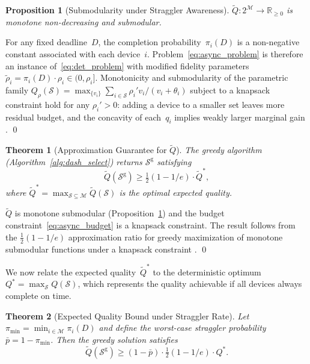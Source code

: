 \documentclass[a4paper,fleqn]{cas-dc}
\newtheorem{theorem}{Theorem}
\newtheorem{proposition}{Proposition}
\newcommand{\Mset}{\mathcal{M}}
\newcommand{\Sset}{\mathcal{S}}
\begin{document}
	\begin{proposition}[Submodularity under Straggler Awareness]
		\label{prop:sub_async}
		$\tilde{Q}: 2^{\Mset} \to \mathbb{R}_{\geq 0}$ is monotone
		non-decreasing and submodular.
	\end{proposition}
	
	\begin{pf}
		For any fixed deadline~$D$, the completion
		probability~$\pi_i(D)$ is a non-negative constant associated with
		each device~$i$.  Problem~\eqref{eq:async_problem} is therefore an
		instance of~\eqref{eq:det_problem} with modified fidelity parameters
		$\tilde{\rho}_i = \pi_i(D) \cdot \rho_i \in (0, \rho_i]$.
		Monotonicity and submodularity of the parametric family
		$Q_{\rho}(\Sset) = \max_{\{v_i\}} \sum_{i \in \Sset}
		\rho_i' v_i / (v_i + \theta_i)$ subject to a knapsack constraint
		hold for any $\rho_i' > 0$: adding a device to a smaller set leaves
		more residual budget, and the concavity of each~$q_i$ implies weakly
		larger marginal gain \citep{boyd_convex}.
		\qed\end{pf}
	
	\begin{theorem}[Approximation Guarantee for $\tilde{Q}$]
		\label{thm:approx_async}
		The greedy algorithm (Algorithm~\ref{alg:dash_select}) returns
		$\Sset^{\mathrm{g}}$ satisfying
		\begin{equation}\label{eq:greedy_bound}
			\tilde{Q}(\Sset^{\mathrm{g}})
			\geq \tfrac{1}{2}(1 - 1/e) \cdot \tilde{Q}^*,
		\end{equation}
		where
		$\tilde{Q}^* = \max_{\Sset \subseteq \Mset} \tilde{Q}(\Sset)$
		is the optimal expected quality.
	\end{theorem}
	
	\begin{pf}
		$\tilde{Q}$ is monotone submodular
		(Proposition~\ref{prop:sub_async}) and the budget
		constraint~\eqref{eq:async_budget} is a knapsack constraint.  The
		result follows from the $\tfrac{1}{2}(1 - 1/e)$ approximation ratio
		for greedy maximization of monotone submodular functions under a
		knapsack constraint \citep{khuller_knapsack}.
		\qed\end{pf}
	
	We now relate the expected quality~$\tilde{Q}^*$ to the
	deterministic optimum $Q^* = \max_{\Sset} Q(\Sset)$, which represents
	the quality achievable if all devices always complete on time.
	
	\begin{theorem}[Expected Quality Bound under Straggler Rate]
		\label{thm:straggler_bound}
		Let $\pi_{\min} = \min_{i \in \Mset} \pi_i(D)$ and define the
		worst-case straggler probability $\bar{p} = 1 - \pi_{\min}$.
		Then the greedy solution satisfies
		\begin{equation}\label{eq:straggler_bound}
			\tilde{Q}(\Sset^{\mathrm{g}})
			\geq (1 - \bar{p}) \cdot
			\tfrac{1}{2}(1 - 1/e) \cdot Q^*.
		\end{equation}
	\end{theorem}
	
\end{document}
